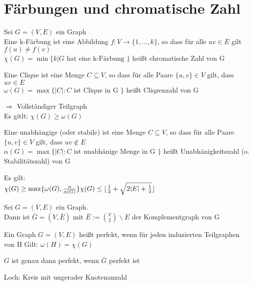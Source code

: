 \documentclass[14pt]{article}
\begin{document}
\section{Färbungen und chromatische Zahl}
\begin{definition}[k-Färbung]
    Sei $G = (V, E)$ ein Graph \\
    Eine k-Färbung ist eine Abbildung $f: V \rightarrow \{1, \dots, k\}$,
    so dass für alle $uv \in E$ gilt $f(u) \neq f(v)$ \\
    $\chi(G) = \min \{k | G \text{ hat eine k-Färbung }\}$ heißt
    chromatische Zahl von G
\end{definition}
\begin{definition} [Clique]
    Eine Clique ist eine Menge $C \subseteq V$, so dass für alle Paare
    $\{u, v\} \in V$ gilt, dass $uv \in E$ \\
    $\omega(G) = \max \{|C|: C \text{ ist Clique in G }\}$ heißt
    Cliqzenzahl von G
\end{definition}
$\Rightarrow$ Vollständiger Teilgraph \\
Es gitlt:  $\chi(G) \geq \omega(G)$
\begin{definition}
    Eine unabhängige (oder stabile) ist eine Menge $C \subseteq V$, so dass für 
    alle Paare$\{u, v\} \in V$ gilt, dass $uv \notin E$ \\
    $\alpha(G) = \max \{|C|: C \text{ ist unabhänige Menge in G }\}$ heißt
    Unabhänigkeitszahl (o. Stabilitätszahl) von G
\end{definition}
Es gilt: \\
$
    \chi(G) \geq \max \{\omega(G), \frac{n}{\alpha(G)}\} \\
    \chi(G) \leq \lfloor \frac{1}{2} + \sqrt{2 |E| + \frac{1}{4}} \rfloor
$
\begin{definition}[Komplementgraph]
    Sei $G = (V, E)$ ein Graph. \\
    Dann ist $\bar{G} = (V, \bar{E})$ mit $\bar{E} := \binom{V}{2} \backslash E$
    der Komplementgraph von G
\end{definition}
\begin{definition}
    Ein Graph $G = (V, E)$ heißt perfekt, wenn für jeden induzierten 
    Teilgraphen von H Gilt: $\omega(H) = \chi(G)$
\end{definition}
\begin{eigenschaft}
    $G$ ist genau dann perfekt, wenn $\bar{G}$ perfekt ist
\end{eigenschaft}
Loch: Kreis mit ungerader Knotenanzahl \\
\end{document}
